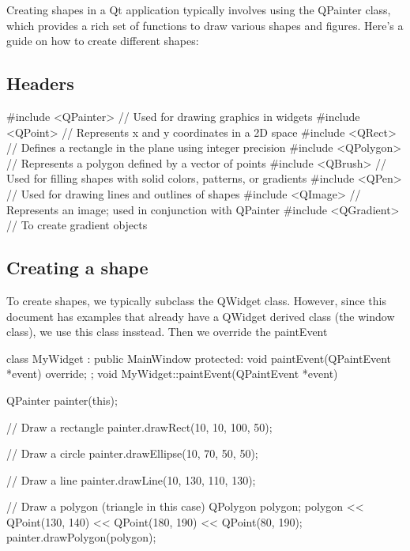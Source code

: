 \documentclass{report}
\begin{document}
    \pagebreak 
    \bigbreak \noindent 
    Creating shapes in a Qt application typically involves using the QPainter class, which provides a rich set of functions to draw various shapes and figures. Here's a guide on how to create different shapes:

    \bigbreak \noindent 
    \subsection{Headers}
    \bigbreak \noindent 
    \begin{cppcode}
        #include <QPainter>      // Used for drawing graphics in widgets
        #include <QPoint>        // Represents x and y coordinates in a 2D space
        #include <QRect>         // Defines a rectangle in the plane using integer precision
        #include <QPolygon>      // Represents a polygon defined by a vector of points
        #include <QBrush>        // Used for filling shapes with solid colors, patterns, or gradients
        #include <QPen>          // Used for drawing lines and outlines of shapes
        #include <QImage>        // Represents an image; used in conjunction with QPainter
        #include <QGradient>     // To create gradient objects
    \end{cppcode}
    \pagebreak 
    \subsection{Creating a shape}
    \bigbreak \noindent 
    To create shapes, we typically  subclass the QWidget class. However, since this document has examples that already have a QWidget derived class (the window class), we use this class insstead. Then we override the paintEvent
    \bigbreak \noindent 
    \begin{cppcode}
class MyWidget : public MainWindow {
protected:
    void paintEvent(QPaintEvent *event) override;
};
void MyWidget::paintEvent(QPaintEvent *event) {
    QPainter painter(this);

    // Draw a rectangle
    painter.drawRect(10, 10, 100, 50);

    // Draw a circle
    painter.drawEllipse(10, 70, 50, 50);

    // Draw a line
    painter.drawLine(10, 130, 110, 130);

    // Draw a polygon (triangle in this case)
    QPolygon polygon;
    polygon << QPoint(130, 140) << QPoint(180, 190) << QPoint(80, 190);
    painter.drawPolygon(polygon);
}
    \end{cppcode}
\end{document}
